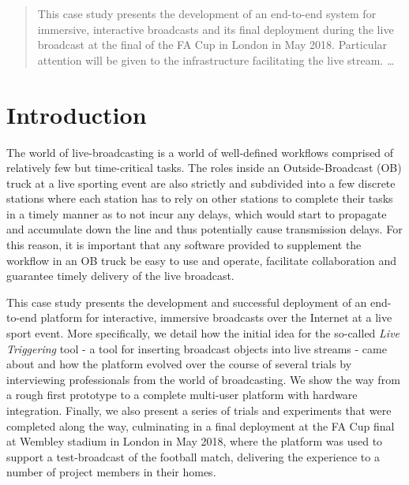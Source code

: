 \documentclass[sigchi-a, authorversion]{acmart}
\begin{document}


\begin{abstract}
This case study presents the development of an end-to-end system for
immersive, interactive broadcasts and its final deployment during the live
broadcast at the final of the FA Cup in London in May 2018. Particular attention
will be given to the infrastructure facilitating the live stream.
\ldots
\end{abstract}



\maketitle

\section{Introduction}

 The world of live-broadcasting is a world of well-defined workflows comprised of relatively few but time-critical tasks. The roles inside an Outside-Broadcast (OB) truck at a live sporting event are also strictly and subdivided into a few discrete stations where each station  has to rely on other stations to complete their tasks in a timely manner as to  not incur any delays, which would start to propagate and accumulate down the line and thus potentially cause transmission delays. For this reason, it is important that any software provided to supplement the workflow in an OB truck be easy to use and operate, facilitate collaboration and guarantee timely delivery of the live broadcast.

 This case study presents the development and successful deployment of an end-to-end platform for interactive, immersive broadcasts over the Internet at a live sport event. More specifically, we detail how the initial idea for the so-called \emph{Live Triggering} tool - a tool for inserting broadcast objects into live streams - came about and how the platform evolved over the course of several trials by interviewing professionals from the world  of broadcasting. We show the way from a rough first prototype to a complete multi-user platform with hardware integration. Finally, we also present a series of trials and experiments that were completed along the way,  culminating in a final deployment at the FA Cup final at Wembley stadium in London in May 2018, where the platform was used to support a test-broadcast of the football match, delivering the experience to a number of project members in their homes.
\end{document}
